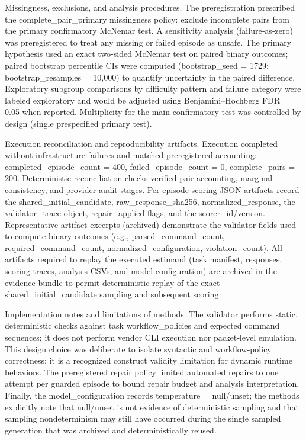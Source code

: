 \documentclass[conference]{IEEEtran}
\begin{document}
Missingness, exclusions, and analysis procedures. The preregistration prescribed the complete\_pair\_primary missingness policy: exclude incomplete pairs from the primary confirmatory McNemar test. A sensitivity analysis (failure‑as‑zero) was preregistered to treat any missing or failed episode as unsafe. The primary hypothesis used an exact two‑sided McNemar test on paired binary outcomes; paired bootstrap percentile CIs were computed (bootstrap\_seed = 1729; bootstrap\_resamples = 10,000) to quantify uncertainty in the paired difference. Exploratory subgroup comparisons by difficulty pattern and failure category were labeled exploratory and would be adjusted using Benjamini--Hochberg FDR = 0.05 when reported. Multiplicity for the main confirmatory test was controlled by design (single prespecified primary test).

Execution reconciliation and reproducibility artifacts. Execution completed without infrastructure failures and matched preregistered accounting: completed\_episode\_count = 400, failed\_episode\_count = 0, complete\_pairs = 200. Deterministic reconciliation checks verified pair accounting, marginal consistency, and provider audit stages. Per‑episode scoring JSON artifacts record the shared\_initial\_candidate, raw\_response\_sha256, normalized\_response, the validator\_trace object, repair\_applied flags, and the scorer\_id/version. Representative artifact excerpts (archived) demonstrate the validator fields used to compute binary outcomes (e.g., parsed\_command\_count, required\_command\_count, normalized\_configuration, violation\_count). All artifacts required to replay the executed estimand (task manifest, responses, scoring traces, analysis CSVs, and model configuration) are archived in the evidence bundle to permit deterministic replay of the exact shared\_initial\_candidate sampling and subsequent scoring.

Implementation notes and limitations of methods. The validator performs static, deterministic checks against task workflow\_policies and expected command sequences; it does not perform vendor CLI execution nor packet‑level emulation. This design choice was deliberate to isolate syntactic and workflow‑policy correctness; it is a recognized construct validity limitation for dynamic runtime behaviors. The preregistered repair policy limited automated repairs to one attempt per guarded episode to bound repair budget and analysis interpretation. Finally, the model\_configuration records temperature = null/unset; the methods explicitly note that null/unset is not evidence of deterministic sampling and that sampling nondeterminism may still have occurred during the single sampled generation that was archived and deterministically reused.
\end{document}
